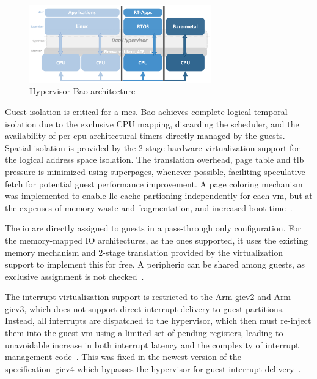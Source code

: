 \begin{figure}[!hbt]
  \centering
  \includegraphics[width=0.7\textwidth]{./img/png/bao-arch} 
%   
  \caption[Hypervisor Bao architecture]{Hypervisor Bao architecture~\cite{martins_et_al:OASIcs:2020:11779}\footnotemark}%
  \label{fig:bao-arch}
\end{figure}
%
%

Guest isolation is critical for a \gls{mcs}. Bao achieves complete logical
temporal isolation due to the exclusive CPU mapping, discarding the scheduler,
and the availability of per-\gls{cpu} architectural timers directly managed by
the guests. Spatial isolation is provided by the 2-stage hardware virtualization
support for the logical address space isolation. The translation overhead, page
table and \gls{tlb} pressure is minimized using superpages, whenever
possible, faciliting speculative fetch for potential guest performance
improvement. A page coloring mechanism was implemented to enable \gls{llc}
cache partioning independently for each \gls{vm}, but at the expenses of memory
waste and fragmentation, and increased boot time~\cite{martins_et_al:OASIcs:2020:11779}.

The \gls{io} are directly assigned to guests in a pass-through only
configuration. For the memory-mapped IO architectures, as the ones supported, it
uses the existing memory mechanism and 2-stage translation provided by the
virtualization support to implement this for free. A peripheric can be shared
among guests, as exclusive assignment is not checked~\cite{martins_et_al:OASIcs:2020:11779}.

The interrupt virtualization support is restricted to the Arm \gls{gic}v2 and
Arm \gls{gic}v3, which does not support direct interrupt delivery to guest
partitions. Instead, all interrupts
are dispatched to the hypervisor, which then must re-inject them into the guest \gls{vm} using
a limited set of pending registers, leading to unavoidable increase in both
interrupt latency and the complexity of interrupt management code~\cite{martins_et_al:OASIcs:2020:11779}. This was
fixed in the newest version of the specification~\gls{gic}v4 which bypasses the hypervisor for guest interrupt delivery~\cite{dall2018design}.

